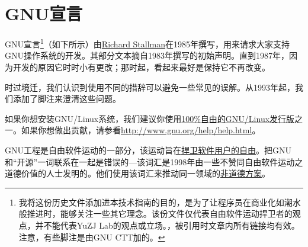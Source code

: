 \section{GNU宣言}
GNU宣言\footnote{我将这份历史文件添加进本技术指南的目的，是为了让程序员在商业化如潮水般推进时，能够关注一些其它理念。该份文件仅代表自由软件运动捍卫者的观点，并不能代表YuZJ Lab的观点或立场。\cite{gnum}，被引用时文章内所有链接均有效。注意，有些脚注是由GNU CTT加的。}（如下所示）由\href{http://www.stallman.org/}{Richard Stallman}在1985年撰写，用来请求大家支持GNU操作系统的开发。其部分文本摘自1983年撰写的初始声明。直到1987年，因为开发的原因它时时小有更改；那时起，看起来最好是保持它不再改变。\par
时过境迁，我们认识到使用不同的措辞可以避免一些常见的误解。从1993年起，我们添加了脚注来澄清这些问题。\par
如果你想安装GNU/Linux系统，我们建议你使用\href{http://www.gnu.org/distros}{100\%自由的GNU/Linux发行版}之一。如果你想做出贡献，请参看\url{http://www.gnu.org/help/help.html}。\par
GNU工程是自由软件运动的一部分，该运动旨在\href{http://www.gnu.org/philosophy/free-sw.html}{捍卫软件用户的自由}。把GNU和“开源”一词联系在一起是错误的—该词汇是1998年由一些不赞同自由软件运动之道德价值的人士发明的。他们使用该词汇来推动同一领域的\href{http://www.gnu.org/philosophy/open-source-misses-the-point.html}{非道德方案}。\par
